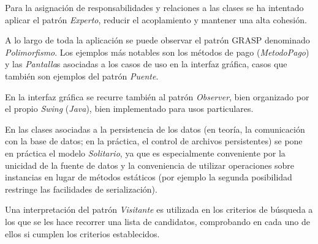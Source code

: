 \documentclass[11pt, a4paper, twoside, titlepage]{article}
\begin{document}
		Para la asignación de responsabilidades y relaciones a las clases se ha intentado aplicar el patrón \textit{Experto}, reducir el acoplamiento y 	mantener una alta cohesión.

		A lo largo de toda la aplicación se puede observar el patrón GRASP denominado \textit{Polimorfismo}. Los ejemplos más notables son los métodos de pago (\textit{MetodoPago}) y las \textit{Pantalla}s asociadas a los casos de uso en la interfaz gráfica, casos que también son ejemplos del patrón \textit{Puente}.

		En la interfaz gráfica se recurre también al patrón \textit{Observer}, bien organizado por el propio \textit{Swing} (\textit{Java}), bien implementado para usos particulares.

		En las clases asociadas a la persistencia de los datos (en teoría, la comunicación con la base de datos; en la práctica, el control de archivos persistentes) se pone en práctica el modelo \textit{Solitario}, ya que es especialmente conveniente por la unicidad de la fuente de datos y la conveniencia de utilizar operaciones sobre instancias en lugar de métodos estáticos (por ejemplo la segunda posibilidad restringe las facilidades de serialización).

		Una interpretación del patrón \textit{Visitante} es utilizada en los criterios de búsqueda a los que se les hace recorrer una lista de candidatos, comprobando en cada uno de ellos si cumplen los criterios establecidos.
\end{document}
